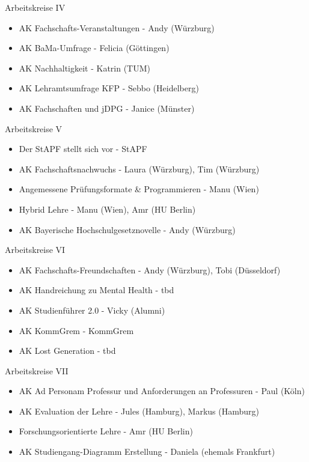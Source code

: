 \begin{frame}{Arbeitskreise IV}
	\begin{itemize}
		\item AK Fachschafts-Veranstaltungen - Andy (Würzburg)
		\item AK BaMa-Umfrage - Felicia (Göttingen)
		\item AK Nachhaltigkeit - 	Katrin (TUM)
		\item AK Lehramtsumfrage KFP - Sebbo (Heidelberg)
		\item AK Fachschaften und jDPG - Janice (Münster)
	\end{itemize}
\end{frame}

\begin{frame}{Arbeitskreise V}
	\begin{itemize}
		\item Der StAPF stellt sich vor - StAPF
		\item AK Fachschaftsnachwuchs - Laura (Würzburg), Tim (Würzburg) 
		\item Angemessene Prüfungsformate \& Programmieren - Manu (Wien) 
		\item Hybrid Lehre - Manu (Wien), Amr (HU Berlin)
		\item AK Bayerische Hochschulgesetznovelle	- Andy (Würzburg) 
	\end{itemize}
\end{frame}

\begin{frame}{Arbeitskreise VI}
	\begin{itemize}
		\item AK Fachschafts-Freundschaften - Andy (Würzburg), Tobi (Düsseldorf)
		\item AK Handreichung zu Mental Health - tbd 
		\item AK Studienführer 2.0 - Vicky (Alumni) 
		\item AK KommGrem - KommGrem 
		\item AK Lost Generation - tbd
	\end{itemize}
\end{frame}

\begin{frame}{Arbeitskreise VII}
	\begin{itemize}
		\item AK Ad Personam Professur und Anforderungen an Professuren - Paul (Köln)
		\item AK Evaluation der Lehre - Jules (Hamburg), Markus (Hamburg)
		\item Forschungsorientierte Lehre - Amr (HU Berlin)
		\item AK Studiengang-Diagramm Erstellung - Daniela (ehemals Frankfurt) %
	\end{itemize}
\end{frame}

